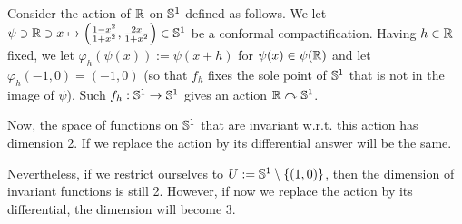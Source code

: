 \documentclass[10pt]{article} %
\title{}
\author{Alex Leontiev}
\begin{document}
\maketitle
Consider the action of $\mathbb{R}$ on $\mathbb{S}^1$ defined as follows. We let $\psi\ni\mathbb{R}\ni x\mapsto\left( \frac{1-x^2}{1+x^2},\frac{2x}{1+x^2} 
\right)\in\mathbb{S}^1$
be a conformal compactification. Having $h\in\mathbb{R}$ fixed, we let $\varphi_h(\psi(x)):=\psi(x+h)$ for $\psi(x)\in\psi(\mathbb{R})
$ and let $\varphi_h(-1,0)=(-1,0)$ (so that $f_h$ fixes the sole point of $\mathbb{S}^1$ that is not in the image of $\psi$).
Such $f_h:\mathbb{S}^1\to\mathbb{S}^1$ gives an action $\mathbb{R}\curvearrowright\mathbb{S}^1$.

Now, the space of functions on $\mathbb{S}^1$ that are invariant w.r.t. this action has dimension 2. If we replace the action by
its differential answer will be the same.

Nevertheless, if we restrict ourselves to $U:=\mathbb{S}^1\setminus\left\{ (1,0) \right\}$, then the dimension of invariant functions
is still 2. However, if now we replace the action by its differential, the dimension will become 3.
\end{document}

